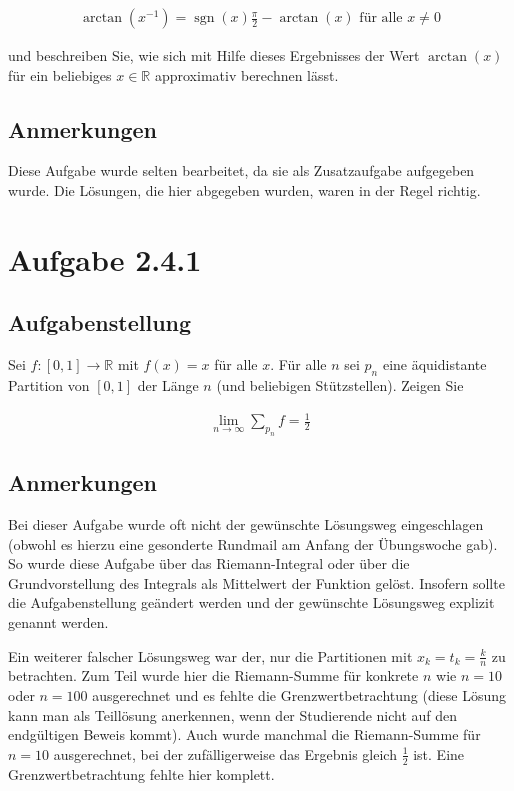\documentclass[a4paper]{article}
\newcommand*{\R}{\mathbb R}
\begin{document}
\begin{align}
  \operatorname{arctan}\left(x^{-1}\right)= \operatorname{sgn}(x) \frac{\pi}2 - \operatorname{arctan}(x)\text{ für alle } x\neq 0
\end{align}

und beschreiben Sie, wie sich mit Hilfe dieses Ergebnisses der Wert $\operatorname{arctan}(x)$ für ein beliebiges $x\in \R$ approximativ berechnen lässt.

\subsection{Anmerkungen}

Diese Aufgabe wurde selten bearbeitet, da sie als Zusatzaufgabe aufgegeben wurde. Die Lösungen, die hier abgegeben wurden, waren in der Regel richtig.

\section{Aufgabe 2.4.1}

\subsection{Aufgabenstellung}

Sei $f:[0,1]\to\R$ mit $f(x)=x$ für alle $x$. Für alle $n$ sei $p_n$ eine äquidistante Partition von $[0,1]$ der Länge $n$ (und beliebigen Stützstellen). Zeigen Sie

\begin{align}
  \lim_{n\to\infty} \sum_{p_n} f = \frac 12
\end{align}

\subsection{Anmerkungen}

Bei dieser Aufgabe wurde oft nicht der gewünschte Lösungsweg eingeschlagen (obwohl es hierzu eine gesonderte Rundmail am Anfang der Übungswoche gab). So wurde diese Aufgabe über das Riemann-Integral oder über die Grundvorstellung des Integrals als Mittelwert der Funktion gelöst. Insofern sollte die Aufgabenstellung geändert werden und der gewünschte Lösungsweg explizit genannt werden.

Ein weiterer falscher Lösungsweg war der, nur die Partitionen mit $x_k = t_k = \frac kn$ zu betrachten. Zum Teil wurde hier die Riemann-Summe für konkrete $n$ wie $n=10$ oder $n=100$ ausgerechnet und es fehlte die Grenzwertbetrachtung (diese Lösung kann man als Teillösung anerkennen, wenn der Studierende nicht auf den endgültigen Beweis kommt). Auch wurde manchmal die Riemann-Summe für $n=10$ ausgerechnet, bei der zufälligerweise das Ergebnis gleich $\frac 12$ ist. Eine Grenzwertbetrachtung fehlte hier komplett.
\end{document}
